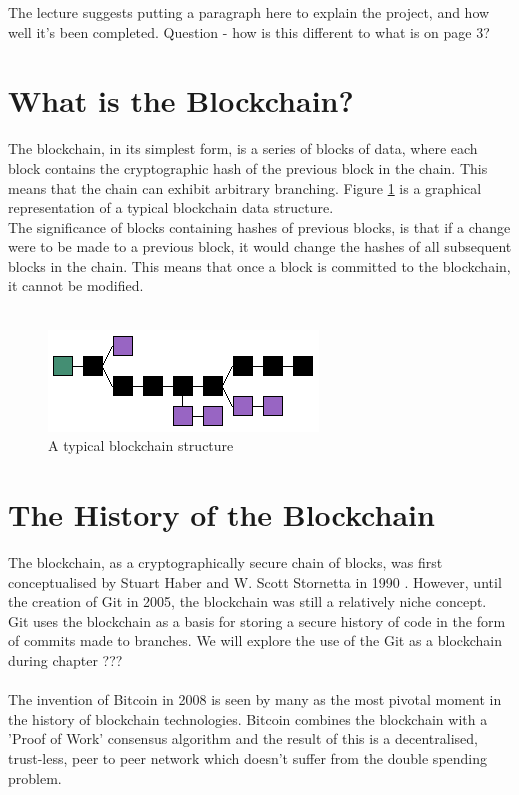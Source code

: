 \documentclass[12pt,a4paper,twoside,openright]{report}
\begin{document}
	The lecture suggests putting a paragraph here to explain the project, and how well it's been completed. Question - how is this different to what is on page 3?

	\section{What is the Blockchain?}
	
	The blockchain, in its simplest form, is a series of blocks of data, where each block contains the cryptographic hash of the previous block in the chain. This means that the chain can exhibit arbitrary branching. Figure \ref{fig:mainblockchain} is a graphical representation of a typical blockchain data structure.\\
	The significance of blocks containing hashes of previous blocks, is that if a change were to be made to a previous block, it would change the hashes of all subsequent blocks in the chain. This means that once a block is committed to the blockchain, it cannot be modified. \\
	\\
	\begin{figure}
		\includegraphics[width=\linewidth]{figs/blockchain}
		\caption{A typical blockchain structure}
		\label{fig:mainblockchain}
	\end{figure}
	
	\section{The History of the Blockchain}
	The blockchain, as a cryptographically secure chain of blocks, was first conceptualised by Stuart Haber and W. Scott Stornetta in 1990 \cite{HaberStornetta}.
	However, until the creation of Git \cite{Git} in 2005, the blockchain was still a relatively niche concept.\\
	Git uses the blockchain as a basis for storing a secure history of code in the form of commits made to branches.
	We will explore the use of the Git as a blockchain during chapter ??? \\
	\\
	The invention of Bitcoin\cite{Bitcoin} in 2008 is seen by many as the most pivotal moment in the history of blockchain technologies.
	Bitcoin combines the blockchain with a 'Proof of Work' consensus algorithm and the result of this is a decentralised, trust-less, peer to peer network which doesn't suffer from the double spending problem. \\
	\\
\end{document}
